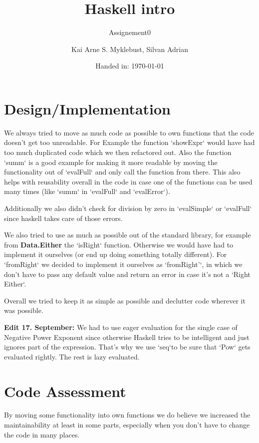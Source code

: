 \documentclass[12pt,a4paper]{article}
\begin{document}
\title{Haskell intro}
\subtitle{Assignement0}

\author{Kai Arne S. Myklebust, Silvan Adrian}
\date{Handed in: \today}
	
\maketitle
\tableofcontents

\section{Design/Implementation}
We always tried to move as much code as possible to own functions that the code doesn't get too unreadable.
For Example the function `showExpr` would have had too much duplicated code which we then refactored out.
Also the function `summ` is a good example for making it more readable by moving the functionality out of `evalFull` and only call the function from there.
This also helps with reusability overall in the code in case one of the functions can be used many times (like `summ` in `evalFull` and `evalError`).

Additionally we also didn't check for division by zero in `evalSimple` or `evalFull` since haskell takes care of those errors.

We also tried to use as much as possible out of the standard library, for example from \textbf{Data.Either} the `isRight` function. Otherwise we would have had to implement it ourselves (or end up doing something totally different). For `fromRight` we decided to implement it ourselves as `fromRight'`, in which we don't have to pass any default value and return an error in case it's not a `Right Either`.

Overall we tried to keep it as simple as possible and declutter code wherever it was possible. \newline

\textbf{Edit 17. September:}
We had to use eager evaluation for the single case of Negative Power Exponent since otherwise Haskell tries to be intelligent and just ignores part of the expression.
That's why we use `seq`to be sure that `Pow` gets evaluated rightly.
The rest is lazy evaluated.



\section{Code Assessment}

By moving some functionality into own functions we do believe we increased the maintainability at least in some parts, especially when you don't have to change the code in many places.
\end{document}
